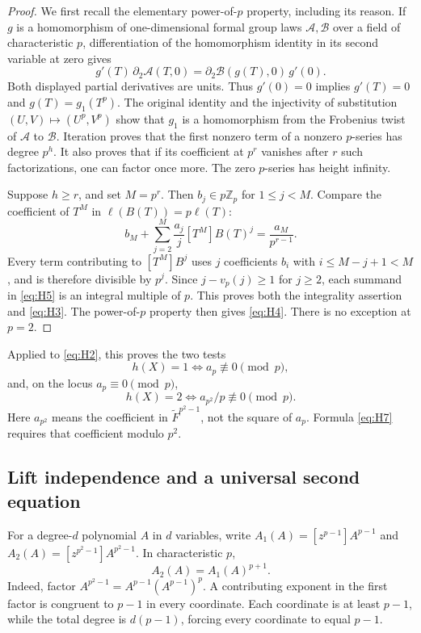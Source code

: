 \begin{proof}
We first recall the elementary power-of-$p$ property, including its
reason. If $g$ is a homomorphism of one-dimensional formal group laws
$\mathcal A,\mathcal B$ over a field of characteristic $p$, differentiation
of the homomorphism identity in its second variable at zero gives
\[
 g'(T)\,\partial_2\mathcal A(T,0)
 =\partial_2\mathcal B(g(T),0)\,g'(0).
\]
Both displayed partial derivatives are units. Thus $g'(0)=0$ implies
$g'(T)=0$ and $g(T)=g_1(T^p)$. The original identity and the injectivity
of substitution $(U,V)\mapsto(U^p,V^p)$ show that $g_1$ is a
homomorphism from the Frobenius twist of $\mathcal A$ to $\mathcal B$.
Iteration proves that the first nonzero term of a nonzero $p$-series
has degree $p^h$. It also proves that if its coefficient at $p^r$
vanishes after $r$ such factorizations, one can factor once more.
The zero $p$-series has height infinity.

Suppose $h\ge r$, and set $M=p^r$. Then $b_j\in p\mathbb Z_p$ for
$1\le j<M$. Compare the coefficient of $T^M$ in
$\ell(B(T))=p\ell(T)$:
\begin{equation}
 b_M+\sum_{j=2}^{M}\frac{a_j}{j}[T^M]B(T)^j
       =\frac{a_M}{p^{r-1}}.                        \label{eq:H5}
\end{equation}
Every term contributing to $[T^M]B^j$ uses $j$ coefficients $b_i$
with $i\le M-j+1<M$, and is therefore divisible by $p^j$.
Since $j-v_p(j)\ge1$ for $j\ge2$, each summand in \eqref{eq:H5} is an
integral multiple of $p$. This proves both the integrality assertion
and \eqref{eq:H3}. The power-of-$p$ property then gives \eqref{eq:H4}.
There is no exception at $p=2$.
\end{proof}

Applied to \eqref{eq:H2}, this proves the two tests
\begin{equation}
 h(X)=1\iff a_p\not\equiv0\pmod p,                  \label{eq:H6}
\end{equation}
and, on the locus $a_p\equiv0\pmod p$,
\begin{equation}
 h(X)=2\iff a_{p^2}/p\not\equiv0\pmod p.            \label{eq:H7}
\end{equation}
Here $a_{p^2}$ means the coefficient in $\widetilde F^{p^2-1}$,
not the square of $a_p$. Formula \eqref{eq:H7} requires that coefficient
modulo $p^2$.

\subsection{Lift independence and a universal second equation}
For a degree-$d$ polynomial $A$ in $d$ variables, write
$A_1(A)=[z^{p-1}]A^{p-1}$ and
$A_2(A)=[z^{p^2-1}]A^{p^2-1}$.
In characteristic $p$,
\begin{equation}
 A_2(A)=A_1(A)^{p+1}.                              \label{eq:H8}
\end{equation}
Indeed, factor $A^{p^2-1}=A^{p-1}(A^{p-1})^p$.
A contributing exponent in the first factor is congruent to $p-1$
in every coordinate. Each coordinate is at least $p-1$, while the
total degree is $d(p-1)$, forcing every coordinate to equal $p-1$.

